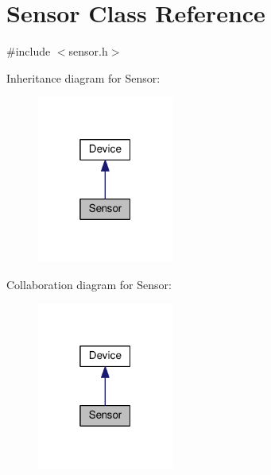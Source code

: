 \hypertarget{class_sensor}{}\section{Sensor Class Reference}
\label{class_sensor}


{\ttfamily \#include $<$sensor.\+h$>$}



Inheritance diagram for Sensor\+:\nopagebreak
\begin{figure}[H]
\begin{center}
\leavevmode
\includegraphics[width=127pt]{class_sensor__inherit__graph}
\end{center}
\end{figure}


Collaboration diagram for Sensor\+:\nopagebreak
\begin{figure}[H]
\begin{center}
\leavevmode
\includegraphics[width=127pt]{class_sensor__coll__graph}
\end{center}
\end{figure}
